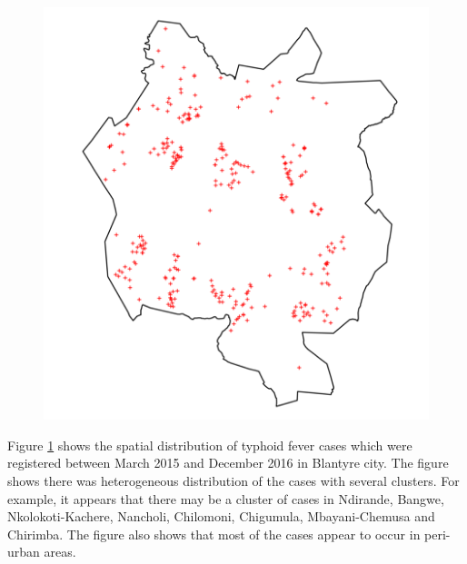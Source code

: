 \begin{figure}[H]
    \begin{center}
        \includegraphics[scale=0.7]{Spatial distribution of typhoid fever in Blantyre city.png}
    \end{center}
     \label{fig:salmonella-spatial-distribution}
\end{figure}

Figure \ref{fig:salmonella-spatial-distribution} shows the spatial distribution of typhoid fever cases which were registered between March 2015 and December 2016 in Blantyre city.
The figure shows there was heterogeneous distribution of the cases with several clusters.
For example, it appears that there may be a cluster of cases in Ndirande, Bangwe, Nkolokoti-Kachere, Nancholi, Chilomoni, Chigumula, Mbayani-Chemusa and Chirimba.
The figure also shows that most of the cases appear to occur in peri-urban areas.


